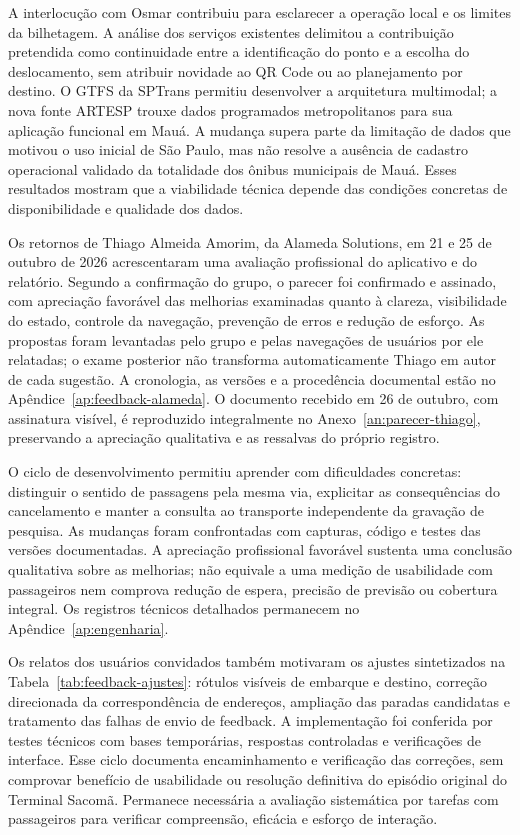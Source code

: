 \documentclass[12pt,oneside,a4paper,brazil,chapter=TITLE]{abntex2}
\begin{document}
A interlocução com Osmar contribuiu para esclarecer a operação local e os limites da bilhetagem. A análise dos serviços existentes delimitou a contribuição pretendida como continuidade entre a identificação do ponto e a escolha do deslocamento, sem atribuir novidade ao QR Code ou ao planejamento por destino. O GTFS da SPTrans permitiu desenvolver a arquitetura multimodal; a nova fonte ARTESP trouxe dados programados metropolitanos para sua aplicação funcional em Mauá. A mudança supera parte da limitação de dados que motivou o uso inicial de São Paulo, mas não resolve a ausência de cadastro operacional validado da totalidade dos ônibus municipais de Mauá. Esses resultados mostram que a viabilidade técnica depende das condições concretas de disponibilidade e qualidade dos dados.

Os retornos de Thiago Almeida Amorim, da Alameda Solutions, em 21 e 25 de outubro de 2026 acrescentaram uma avaliação profissional do aplicativo e do relatório. Segundo a confirmação do grupo, o parecer foi confirmado e assinado, com apreciação favorável das melhorias examinadas quanto à clareza, visibilidade do estado, controle da navegação, prevenção de erros e redução de esforço. As propostas foram levantadas pelo grupo e pelas navegações de usuários por ele relatadas; o exame posterior não transforma automaticamente Thiago em autor de cada sugestão. A cronologia, as versões e a procedência documental estão no Apêndice~\ref{ap:feedback-alameda}. O documento recebido em 26 de outubro, com assinatura visível, é reproduzido integralmente no Anexo~\ref{an:parecer-thiago}, preservando a apreciação qualitativa e as ressalvas do próprio registro.

O ciclo de desenvolvimento permitiu aprender com dificuldades concretas: distinguir o sentido de passagens pela mesma via, explicitar as consequências do cancelamento e manter a consulta ao transporte independente da gravação de pesquisa. As mudanças foram confrontadas com capturas, código e testes das versões documentadas. A apreciação profissional favorável sustenta uma conclusão qualitativa sobre as melhorias; não equivale a uma medição de usabilidade com passageiros nem comprova redução de espera, precisão de previsão ou cobertura integral. Os registros técnicos detalhados permanecem no Apêndice~\ref{ap:engenharia}.

Os relatos dos usuários convidados também motivaram os ajustes sintetizados na Tabela~\ref{tab:feedback-ajustes}: rótulos visíveis de embarque e destino, correção direcionada da correspondência de endereços, ampliação das paradas candidatas e tratamento das falhas de envio de feedback. A implementação foi conferida por testes técnicos com bases temporárias, respostas controladas e verificações de interface. Esse ciclo documenta encaminhamento e verificação das correções, sem comprovar benefício de usabilidade ou resolução definitiva do episódio original do Terminal Sacomã. Permanece necessária a avaliação sistemática por tarefas com passageiros para verificar compreensão, eficácia e esforço de interação.
\end{document}
